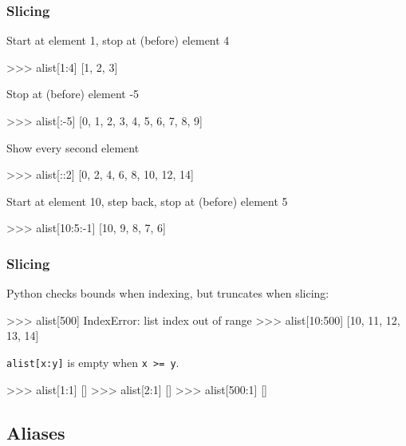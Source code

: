 \documentclass[xetex,10pt]{beamer}
\def\pythoni{\lstinline[language=pythontim]}
\def\spacer{\vspace*{1em}}
\begin{document}
\begin{frame}[fragile]
	\frametitle{Slicing}

Start at element 1, stop at (before) element 4

\begin{python}
>>> alist[1:4]
[1, 2, 3]
\end{python}

\pause
Stop at (before) element -5

\begin{python}
>>> alist[:-5]
[0, 1, 2, 3, 4, 5, 6, 7, 8, 9]
\end{python}

\pause
Show every second element

\begin{python}
>>> alist[::2]
[0, 2, 4, 6, 8, 10, 12, 14]
\end{python}

\pause
Start at element 10, step back, stop at (before) element 5 

\begin{python}
>>> alist[10:5:-1]
[10, 9, 8, 7, 6]
\end{python}

\end{frame}

\begin{frame}[fragile]
	\frametitle{Slicing}

Python checks bounds when indexing, but truncates when slicing:

\begin{python}
>>> alist[500]
IndexError: list index out of range
>>> alist[10:500]
[10, 11, 12, 13, 14]
\end{python}

	\spacer

\pause
\pythoni{alist[x:y]} is empty when \pythoni{x >= y}.

\begin{python}
>>> alist[1:1]
[]
>>> alist[2:1]
[]
>>> alist[500:1]
[]
\end{python}

\end{frame}

\subsection{Aliases}
\end{document}
